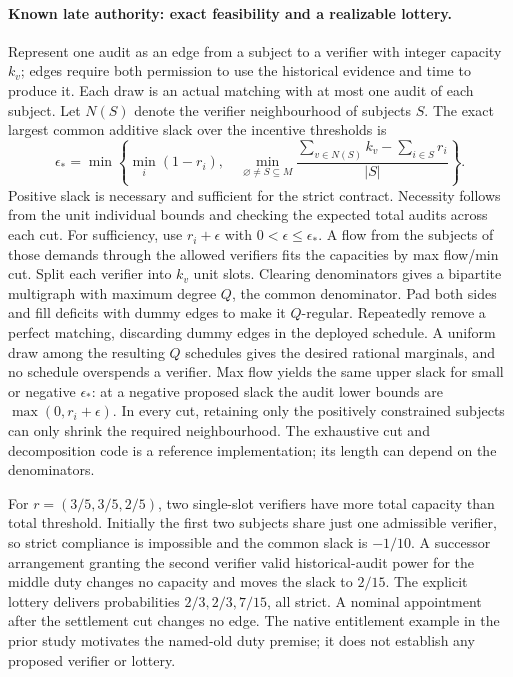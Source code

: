 \documentclass[11pt]{article}
\begin{document}
\paragraph{Known late authority: exact feasibility and a realizable lottery.}
Represent one audit as an edge from a subject to a verifier with
integer capacity \(k_v\); edges require both permission to use the
historical evidence and time to produce it. Each draw is an actual
matching with at most one audit of each subject. Let \(N(S)\) denote
the verifier neighbourhood of subjects \(S\). The exact largest
common additive slack over the incentive thresholds is
\[
 \epsilon_* =
 \min\!\left\{ \min_i (1-r_i),\quad
    \min_{\varnothing\ne S\subseteq M}
   \frac{\sum_{v\in N(S)} k_v - \sum_{i\in S}r_i}{|S|}\right\}.
\]
Positive slack is necessary and sufficient for the strict contract.
Necessity follows from the unit individual bounds and checking the
expected total audits across each cut. For sufficiency, use
\(r_i+\epsilon\) with \(0<\epsilon\le\epsilon_*\). A flow from the
subjects of those demands through the allowed verifiers fits the
capacities by max flow/min cut. Split each verifier into \(k_v\)
unit slots. Clearing denominators gives a bipartite multigraph with
maximum degree \(Q\), the common denominator. Pad both sides and
fill deficits with dummy edges to make it \(Q\)-regular. Repeatedly
remove a perfect matching, discarding dummy edges in the deployed
schedule. A uniform draw among the resulting \(Q\) schedules gives
the desired rational marginals, and no schedule overspends a verifier.
Max flow yields the same upper slack for small or negative
\(\epsilon_*\): at a negative proposed slack the audit lower bounds
are \(\max(0,r_i+\epsilon)\). In every cut, retaining only the positively
constrained subjects can only shrink the required neighbourhood.
The exhaustive cut and decomposition code is a reference
implementation; its length can depend on the denominators.

For \(r=(3/5,3/5,2/5)\), two single-slot verifiers have more total
capacity than total threshold. Initially the first two subjects
share just one admissible verifier, so strict compliance is impossible
and the common slack is \(-1/10\). A successor arrangement granting
the second verifier valid historical-audit power for the middle duty
changes no capacity and moves the slack to \(2/15\). The explicit
lottery delivers probabilities \(2/3,2/3,7/15\), all strict.
A nominal appointment after the settlement cut changes no edge. The
native entitlement example in the prior study motivates the named-old
duty premise; it does not establish any proposed verifier or lottery.
\end{document}
